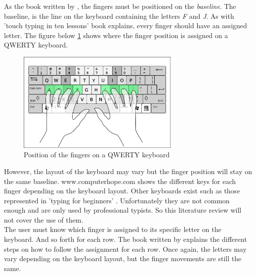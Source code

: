 As the book written by \cite{beginners}, the fingers must be positioned on the \textit{baseline}. The baseline, is the line on the keyboard containing the letters \textit{F} and \textit{J}. As with 'touch typing in ten lessons' \cite{tenlessons} book explains, every finger should have an assigned letter. The figure below \ref{fing_pos} shows where the finger position is assigned on a QWERTY keyboard.
\begin{figure}[H]
	\centering
	\includegraphics[width=0.7\textwidth]{images/fing_pos.png}
	\caption{Position of the fingers on a QWERTY keyboard}\label{fing_pos}
\end{figure}
However, the layout of the keyboard may vary but the finger position will stay on the same baseline. www.computerhope.com \cite{computerhope} shows the different keys for each finger depending on the keyboard layout.
Other keyboards exist such as those represented in 'typing for beginners' \cite{beginners}. Unfortunately they are not common enough and are only used by professional typists. So this literature review will not cover the use of them.\\
The user must know which finger is assigned to its specific letter on the keyboard. And so forth for each row. The book written by \cite{beginners} explains the different steps on how to follow the assignment for each row. Once again, the letters may vary depending on the keyboard layout, but the finger movements are still the same.
